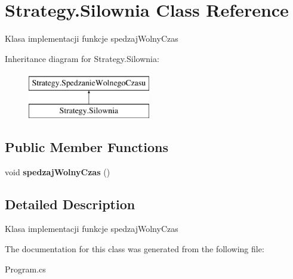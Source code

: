 \hypertarget{class_strategy_1_1_silownia}{}\section{Strategy.\+Silownia Class Reference}
\label{class_strategy_1_1_silownia}


Klasa implementacji funkcje spedzaj\+Wolny\+Czas  


Inheritance diagram for Strategy.\+Silownia\+:\begin{figure}[H]
\begin{center}
\leavevmode
\includegraphics[height=2.000000cm]{class_strategy_1_1_silownia}
\end{center}
\end{figure}
\subsection*{Public Member Functions}
\begin{DoxyCompactItemize}
\item 
\mbox{\label{class_strategy_1_1_silownia_a273e6ffeea532dcb14e8f40874443235}} 
void {\bfseries spedzaj\+Wolny\+Czas} ()
\end{DoxyCompactItemize}


\subsection{Detailed Description}
Klasa implementacji funkcje spedzaj\+Wolny\+Czas 



The documentation for this class was generated from the following file\+:\begin{DoxyCompactItemize}
\item 
Program.\+cs\end{DoxyCompactItemize}

